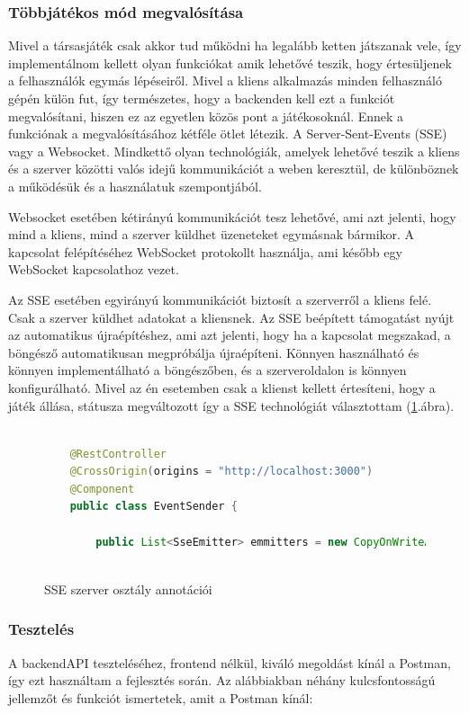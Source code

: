 \documentclass[a4paper,twoside]{article}
\begin{document}
\subsubsection{Többjátékos mód megvalósítása}
Mivel a társasjáték csak akkor tud működni ha legalább ketten játszanak vele, így implementálnom kellett olyan funkciókat amik lehetővé teszik, hogy értesüljenek 
a felhasználók egymás lépéseiről. Mivel a kliens alkalmazás minden felhasználó gépén külön fut, így természetes, hogy a backenden kell ezt a funkciót megvalósítani, hiszen ez az egyetlen közös pont a játékosoknál. Ennek a funkciónak a megvalósításához kétféle ötlet létezik. A Server-Sent-Events (SSE) vagy a Websocket. Mindkettő olyan technológiák, amelyek lehetővé teszik a kliens és a szerver közötti valós idejű kommunikációt a weben keresztül, de különböznek a működésük és a használatuk szempontjából.

Websocket esetében kétirányú kommunikációt tesz lehetővé, ami azt jelenti, hogy mind a kliens, mind a szerver küldhet üzeneteket egymásnak bármikor. A kapcsolat felépítéséhez WebSocket protokollt használja, ami később egy WebSocket kapcsolathoz vezet.
 
Az SSE esetében egyirányú kommunikációt biztosít a szerverről a kliens felé. Csak a szerver küldhet adatokat a kliensnek. Az SSE beépített támogatást nyújt az automatikus újraépítéshez, ami azt jelenti, hogy ha a kapcsolat megszakad, a böngésző automatikusan megpróbálja újraépíteni. Könnyen használható és könnyen implementálható a böngészőben, és a szerveroldalon is könnyen konfigurálható. Mivel az én esetemben csak a klienst kellett értesíteni, hogy a játék állása, státusza megváltozott így a SSE technológiát választottam (\ref{sse}.ábra). 
\begin{figure}
	\caption{SSE szerver osztály annotációi}
	\centering
	\begin{lstlisting}[language=java]
		
	@RestController
	@CrossOrigin(origins = "http://localhost:3000")
	@Component
	public class EventSender {
		
		public List<SseEmitter> emmitters = new CopyOnWriteArrayList<SseEmitter>();
		
	\end{lstlisting}
	\label{sse}
\end{figure} 
\subsubsection{Tesztelés}
A backendAPI teszteléséhez, frontend nélkül, kiváló megoldást kínál a Postman\cite{postman}, így ezt használtam a fejlesztés során. Az alábbiakban néhány kulcsfontosságú jellemzőt és funkciót ismertetek, amit a Postman kínál:
\end{document}

